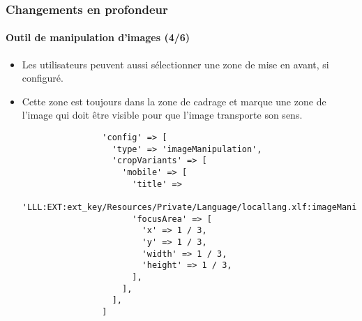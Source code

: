 \begin{frame}[fragile]
	\frametitle{Changements en profondeur}
	\framesubtitle{Outil de manipulation d'images (4/6)}

	\lstset{basicstyle=\tiny\ttfamily}

	\begin{itemize}
		\item Les utilisateurs peuvent aussi sélectionner une zone de mise en avant,
			si configuré.
		\item Cette zone est toujours dans la zone de cadrage et marque une zone de
			l'image qui doit être visible pour que l'image transporte son sens.

			\begin{lstlisting}
				'config' => [
				  'type' => 'imageManipulation',
				  'cropVariants' => [
				    'mobile' => [
				      'title' =>
				        'LLL:EXT:ext_key/Resources/Private/Language/locallang.xlf:imageManipulation.mobile',
				      'focusArea' => [
				        'x' => 1 / 3,
				        'y' => 1 / 3,
				        'width' => 1 / 3,
				        'height' => 1 / 3,
				      ],
				    ],
				  ],
				]
			\end{lstlisting}

	\end{itemize}

\end{frame}


